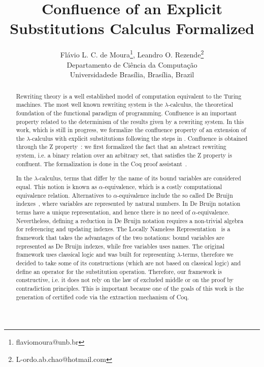 \documentclass[11pt]{article}
\date{}
\begin{document}
\title{Confluence of an Explicit Substitutions Calculus Formalized}

\author{
  {\large Fl\'avio L. C. de Moura}\thanks{flaviomoura@unb.br},
    {\large Leandro O. Rezende}\thanks{L-ordo.ab.chao@hotmail.com}\\
  {\small Departamento de Ci\^encia da Computa\c{c}\~ao}\\
  {\small Universidadede Bras\'ilia, Bras\'ilia, Brazil} }

\maketitle

\begin{abstract}
  Rewriting theory is a well established model of computation
  equivalent to the Turing machines. The most well known rewriting
  system is the $\lambda$-calculus, the theoretical foundation of the
  functional paradigm of programming. Confluence is an important
  property related to the determinism of the results given by a
  rewriting system. In this work, which is still in progress, we
  formalize the confluence property of an extension of the
  $\lambda$-calculus with explicit substitutions following the steps
  in \cite{DK08,kes09}. Confluence is obtained through the Z
  property~\cite{zproperty}: we first formalized the fact that an
  abstract rewriting system, i.e. a binary relation over an arbitrary
  set, that satisfies the Z property is confluent. The formalization
  is done in the Coq proof assistant~\cite{CoqTeam}.

  In the $\lambda$-calculus, terms that differ by the name of its
  bound variables are considered equal. This notion is known as
  $\alpha$-equivalence, which is a costly computational equivalence
  relation. Alternatives to $\alpha$-equivalence include the so called
  De Bruijn indexes~\cite{dB72}, where variables are represented by
  natural numbers. In De Bruijn notation terms have a unique
  representation, and hence there is no need of
  $\alpha$-equivalence. Nevertheless, defining a reduction in De
  Bruijn notation requires a non-trivial algebra for referencing and
  updating indexes. The Locally Nameless Representation~\cite{Ch11} is
  a framework that takes the advantages of the two notations: bound
  variables are represented as De Bruijn indexes, while free variables
  uses names. The original framework uses classical logic and was
  built for representing $\lambda$-terms, therefore we decided to take
  some of its constructions (which are not based on classical logic)
  and define an operator for the substitution operation. Therefore,
  our framework is constructive, i.e. it does not rely on the law of
  excluded middle or on the proof by contradiction principles. This is
  important because one of the goals of this work is the generation of
  certified code via the extraction mechanism of Coq.


\end{abstract}
\end{document}

